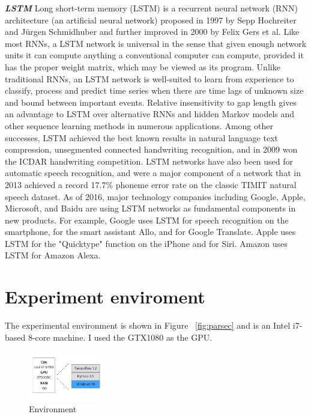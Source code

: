 \documentclass{kcc}
\begin{document}
\textbf{\textit{LSTM}}
Long short-term memory (LSTM) is a recurrent neural network (RNN) architecture (an artificial neural network) proposed in 1997 by Sepp Hochreiter and Jürgen Schmidhuber and further improved in 2000 by Felix Gers et al. Like most RNNs, a LSTM network is universal in the sense that given enough network units it can compute anything a conventional computer can compute, provided it has the proper weight matrix, which may be viewed as its program. Unlike traditional RNNs, an LSTM network is well-suited to learn from experience to classify, process and predict time series when there are time lags of unknown size and bound between important events. Relative insensitivity to gap length gives an advantage to LSTM over alternative RNNs and hidden Markov models and other sequence learning methods in numerous applications. Among other successes, LSTM achieved the best known results in natural language text compression, unsegmented connected handwriting recognition, and in 2009 won the ICDAR handwriting competition. LSTM networks have also been used for automatic speech recognition, and were a major component of a network that in 2013 achieved a record 17.7\% phoneme error rate on the classic TIMIT natural speech dataset. As of 2016, major technology companies including Google, Apple, Microsoft, and Baidu are using LSTM networks as fundamental components in new products. For example, Google uses LSTM for speech recognition on the smartphone, for the smart assistant Allo, and for Google Translate. Apple uses LSTM for the "Quicktype" function on the iPhone and for Siri. Amazon uses LSTM for Amazon Alexa.



\section{Experiment enviroment}

The experimental environment is shown in Figure ~\ref{fig:parsec} and is an Intel i7-based 8-core machine. I used the GTX1080 as the GPU.
\begin{figure}[h]
  \begin{center}
     \includegraphics[width=0.3\textwidth]{fig/env.png}
  \end{center}
  \caption{Environment}
  \label{fig:xeon}
\end{figure}
\end{document}
